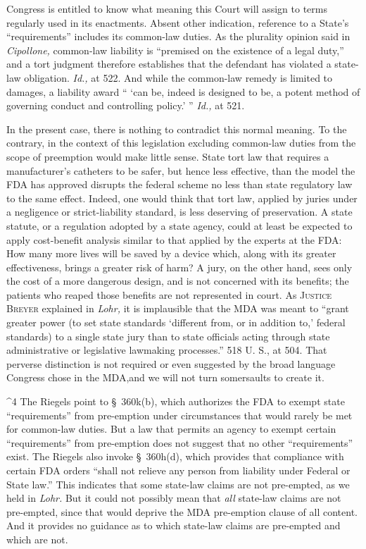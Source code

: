 {  Congress is entitled to know what meaning this Court will assign
to terms regularly used in its enactments. Absent other indication,
reference to a State's ``requirements'' includes its common-law
duties. As the plurality opinion said in \emph{Cipollone,} common-law
liability is ``premised on the existence of a legal duty,'' and a
tort judgment therefore establishes that the defendant has violated a
state-law obligation. \emph{Id.,} at 522. And while the common-law
remedy is limited to damages, a liability award `` ‘can be, indeed
is designed to be, a potent method of governing conduct and controlling
policy.' '' \emph{Id.,} at 521.

  In the present case, there is nothing to contradict this normal
meaning. To the contrary, in the context of this leg\newpage islation
excluding common-law duties from the scope of preemption would make
little sense. State tort law that requires a manufacturer's catheters
to be safer, but hence less effective, than the model the FDA has
approved disrupts the federal scheme no less than state regulatory law
to the same effect. Indeed, one would think that tort law, applied
by juries under a negligence or strict-liability standard, is less
deserving of preservation. A state statute, or a regulation adopted
by a state agency, could at least be expected to apply cost-benefit
analysis similar to that applied by the experts at the FDA: How many
more lives will be saved by a device which, along with its greater
effectiveness, brings a greater risk of harm? A jury, on the other hand,
sees only the cost of a more dangerous design, and is not concerned
with its benefits; the patients who reaped those benefits are not
represented in court. As \textsc{Justice Breyer} explained in \emph{Lohr,} it
is implausible that the MDA was meant to ``grant greater power (to
set state standards ‘different from, or in addition to,' federal
standards) to a single state jury than to state officials acting through
state administrative or legislative lawmaking processes.'' 518 U. S.,
at 504. That perverse distinction is not required or even suggested by
the broad language Congress chose in the MDA,\footnotemark[4] and we will not turn
somersaults to create it. \newpage 

^4 The Riegels point to \S~360k(b), which authorizes the FDA to exempt
state ``requirements'' from pre-emption under circumstances that would
rarely be met for common-law duties. But a law that permits an agency to
exempt certain ``requirements'' from pre-emption does not suggest that
no other ``requirements'' exist. The Riegels also invoke \S~360h(d),
which provides that compliance with certain FDA orders ``shall not
relieve any person from liability under Federal or State law.'' This
indicates that some state-law claims are not pre-empted, as we held in
\emph{Lohr.} But it could not possibly mean that \emph{all} state-law claims
are not pre-empted, since that would deprive the MDA pre-emption clause
of all content. And it provides no guidance as to which state-law claims
are pre-empted and which are not.


}
